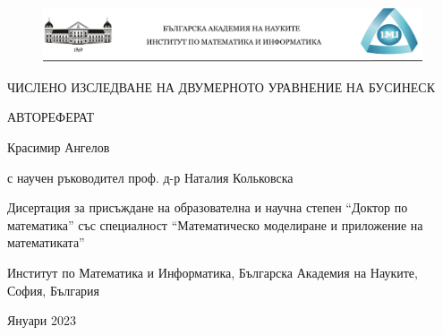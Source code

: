\documentclass[a5paper]{article}
\theoremstyle{remark}
\begin{document}
\begin{normalsize}

\begin{center}
\begin{figure}[!htb]
      \includegraphics[width=1\linewidth]{LogoThesis.png}
\end{figure}

\begin{minipage}{0.95\linewidth}
    \centering
    \vspace{0.5cm}
    {\large ЧИСЛЕНО ИЗСЛЕДВАНЕ НА ДВУМЕРНОТО УРАВНЕНИЕ НА БУСИНЕСК\par}
    \vspace{1.5cm}
    {\large АВТОРЕФЕРАТ\par}
    \vspace{1cm}
    {\large Красимир Ангелов \par с научен ръководител проф. д-р Наталия Кольковска\par}
    \vspace{1cm}
    {\large Дисертация за присъждане на образователна и научна степен ``Доктор по математика'' със специалност ``Математическо моделиране и приложение на математиката''\par}
    \vspace{1cm}
{\large Институт по Математика и Информатика, Българска Академия на Науките, София, България\par}
    \vspace{0.5cm}
    {\large Януари 2023}
\end{minipage}
\end{center}
\clearpage

\shipout\null


\tableofcontents
\newpage



\end{normalsize}
\end{document}
